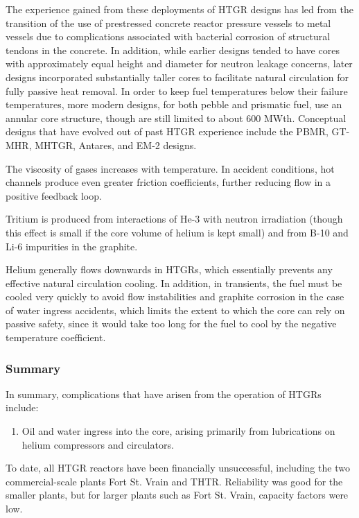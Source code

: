 \documentclass[10pt]{article}
\numberwithin{equation}{section} %
\begin{document}
The experience gained from these deployments of HTGR designs has led from the transition of the use of prestressed concrete reactor pressure vessels to metal vessels due to complications associated with bacterial corrosion of structural tendons in the concrete. In addition, while earlier designs tended to have cores with approximately equal height and diameter for neutron leakage concerns, later designs incorporated substantially taller cores to facilitate natural circulation for fully passive heat removal. In order to keep fuel temperatures below their failure temperatures, more modern designs, for both pebble and prismatic fuel, use an annular core structure, though are still limited to about 600 MWth. Conceptual designs that have evolved out of past HTGR experience include the PBMR, GT-MHR, MHTGR, Antares, and EM-2 designs.
 

The viscosity of gases increases with temperature. In accident conditions, hot channels produce even greater friction coefficients, further reducing flow in a positive feedback loop.

Tritium is produced from interactions of He-3 with neutron irradiation (though this effect is small if the core volume of helium is kept small) and from B-10 and Li-6 impurities in the graphite.

Helium generally flows downwards in HTGRs, which essentially prevents any effective natural circulation cooling. In addition, in transients, the fuel must be cooled very quickly to avoid flow instabilities and graphite corrosion in the case of water ingress accidents, which limits the extent to which the core can rely on passive safety, since it would take too long for the fuel to cool by the negative temperature coefficient.

\subsubsection{Summary}

In summary, complications that have arisen from the operation of HTGRs include:

\begin{enumerate}
\item Oil and water ingress into the core, arising primarily from lubrications on helium compressors and circulators.
\end{enumerate}

To date, all HTGR reactors have been financially unsuccessful, including the two commercial-scale plants Fort St. Vrain and THTR. Reliability was good for the smaller plants, but for larger plants such as Fort St. Vrain, capacity factors were low.
\end{document}
